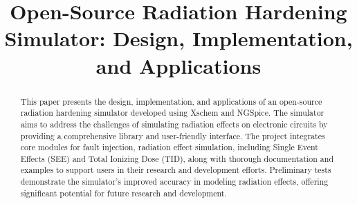 \documentclass[conference]{IEEEtran}
\begin{document}
    \title{Open-Source Radiation Hardening Simulator: Design, Implementation, and Applications}

    \author{
        \and
        \and
        \and
    }

    \maketitle

    \begin{abstract}
        This paper presents the design, implementation, and applications of an open-source radiation hardening simulator developed using Xschem and NGSpice.
        The simulator aims to address the challenges of simulating radiation effects on electronic circuits by providing a comprehensive library and user-friendly interface.
        The project integrates core modules for fault injection, radiation effect simulation, including Single Event Effects (SEE) and Total Ionizing Dose (TID), along with thorough documentation and examples to support users in their research and development efforts.
        Preliminary tests demonstrate the simulator's improved accuracy in modeling radiation effects, offering significant potential for future research and development.
    \end{abstract}
\end{document}

